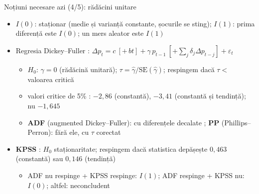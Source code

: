 \begin{frame}{Noțiuni necesare azi (4/5): rădăcini unitare}
\itemsize{\small}
\begin{itemize}
    \item $I(0)$: staționar (medie și varianță constante, șocurile se sting); $I(1)$: prima diferență este $I(0)$; un mers aleator este $I(1)$
    \item Regresia Dickey--Fuller : $\Delta p_t = c\ [+\,bt] + \gamma\, p_{t-1}\ [+ \sum_j \delta_j\Delta p_{t-j}] + \varepsilon_t$
    \begin{itemize}
        \item $H_0$: $\gamma = 0$ (rădăcină unitară); $\tau = \hat\gamma/\mathrm{SE}(\hat\gamma)$; respingem dacă $\tau <$ valoarea critică
        \item valori critice de 5\% : $-2{,}86$ (constantă), $-3{,}41$ (constantă și tendință); nu $-1{,}645$
        \item \textbf{ADF} (augmented Dickey--Fuller): cu diferențele decalate ; \textbf{PP} (Phillips--Perron): fără ele, cu $\tau$ corectat 
    \end{itemize}
    \item \textbf{KPSS} : $H_0$ staționaritate; respingem dacă statistica depășește $0{,}463$ (constantă) sau $0{,}146$ (tendință)
    \begin{itemize}
        \item ADF nu respinge + KPSS respinge: $I(1)$; ADF respinge + KPSS nu: $I(0)$; altfel: neconcludent
    \end{itemize}
\end{itemize}
\end{frame}

